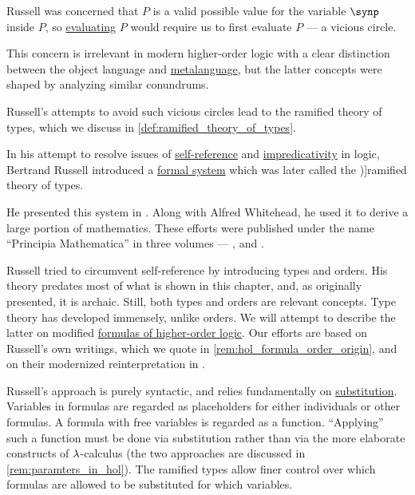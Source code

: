 \begin{remark}
  Russell was concerned that \( P \) is a valid possible value for the variable \( \synp \) inside \( P \), so \hyperref[con:evaluation]{evaluating} \( P \) would require us to first evaluate \( P \) --- a vicious circle.

  This concern is irrelevant in modern higher-order logic with a clear distinction between the object language and \hyperref[con:metalogic]{metalanguage}, but the latter concepts were shaped by analyzing similar conundrums.

  Russell's attempts to avoid such vicious circles lead to the ramified theory of types, which we discuss in \cref{def:ramified_theory_of_types}.
\end{remark}

\begin{definition}\label{def:ramified_theory_of_types}
  In his attempt to resolve issues of \hyperref[ex:self_reference]{self-reference} and \hyperref[con:impredicative_definition]{impredicativity} in logic, Bertrand Russell introduced a \hyperref[con:logical_system]{formal system} which was later called the \term[en=ramified theory of types (\cite[44]{Kleene1971Metamathematics})]{ramified theory of types}.

  He presented this system in \cite{Russell1908TypeTheory}. Along with Alfred Whitehead, he used it to derive a large portion of mathematics. These efforts were published under the name \enquote{Principia Mathematica} in three volumes --- \cite{WhiteheadRussell1927PrincipiaMathematicaVol1}, \cite{WhiteheadRussell1927PrincipiaMathematicaVol2} and \cite{WhiteheadRussell1927PrincipiaMathematicaVol3}.

  Russell tried to circumvent self-reference by introducing types and orders. His theory predates most of what is shown in this chapter, and, as originally presented, it is archaic. Still, both types and orders are relevant concepts. Type theory has developed immensely, unlike orders. We will attempt to describe the latter on modified \hyperref[def:hol_formula]{formulas of higher-order logic}. Our efforts are based on Russell's own writings, which we quote in \cref{rem:hol_formula_order_origin}, and on their modernized reinterpretation in \cite[\S 2B]{KamareddineLaanNederpelt2005TypeTheory}.

  Russell's approach is purely syntactic, and relies fundamentally on \hyperref[con:syntactic_substitution]{substitution}. Variables in formulas are regarded as placeholders for either individuals or other formulas. A formula with free variables is regarded as a function. \enquote{Applying} such a function must be done via substitution rather than via the more elaborate constructs of \( {\mathrm \lambda} \)-calculus (the two approaches are discussed in \cref{rem:paramters_in_hol}). The ramified types allow finer control over which formulas are allowed to be substituted for which variables.


\end{definition}
